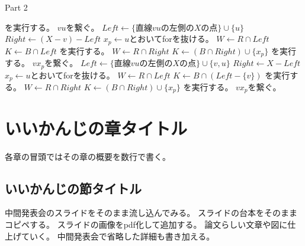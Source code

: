 \documentclass[12pt,a4paper,oneside]{jsbook}
\theoremstyle{plain}
\begin{document}
\begin{algorithm}[H]
\addtocounter{algorithm}{-1}
\caption{Part 2}
\begin{algorithmic}[1]
\State {}を実行する。
\State $vu$を繋ぐ。
\EndIf
\EndIf
{}
\State
$Left \leftarrow \{直線vuの左側のXの点\} \cup \{u\}$
\State $Right \leftarrow (X - v) - Left$
\State $x_p \leftarrow u$とおいてforを抜ける。
\EndIf
\EndFor
\State $W  \leftarrow R \cap Left$
\State $K  \leftarrow B \cap Left$
\State {}を実行する。
\State $W  \leftarrow R \cap Right$
\State $K  \leftarrow (B \cap Right) \cup \{x_p\}$
\State {}を実行する。
\State $vx_p$を繋ぐ。
\EndIf
{}
\State
$Left  \leftarrow \{直線vuの左側のXの点\} \cup \{v, u\}$
\State $Right  \leftarrow X - Left$
\State $x_p \leftarrow u$とおいてforを抜ける。
\EndIf
\EndFor
\State $W  \leftarrow R \cap Left$
\State $K  \leftarrow B \cap (Left - \{v\})$
\State {}を実行する。
\State $W  \leftarrow R \cap Right$
\State $K \leftarrow (B \cap Right) \cup \{x_p\}$
\State {}を実行する。
\State $vx_p$を繋ぐ。
\EndIf
\EndIf
\EndIf
\EndProcedure
\end{algorithmic}
\end{algorithm}



\chapter{いいかんじの章タイトル}
\label{chapter_4}
各章の冒頭ではその章の概要を数行で書く。

\section{いいかんじの節タイトル}
中間発表会のスライドをそのまま流し込んでみる。
スライドの台本をそのままコピペする。
スライドの画像をpdf化して追加する。
論文らしい文章や図に仕上げていく。
中間発表会で省略した詳細も書き加える。
\end{document}
